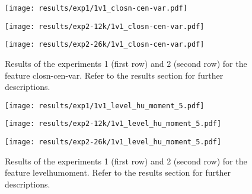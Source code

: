  
\begin{figure}[h!]
    \centering
	\begin{minipage}{0.3\linewidth}
		\texttt{[image: results/exp1/1v1\_closn-cen-var.pdf]}
	\end{minipage}

	\begin{minipage}{0.3\linewidth}
		\texttt{[image: results/exp2-12k/1v1\_closn-cen-var.pdf]}
	\end{minipage}
	\begin{minipage}{0.3\linewidth}
		\texttt{[image: results/exp2-26k/1v1\_closn-cen-var.pdf]}
	\end{minipage}

	\caption[ Results: Feature closn-cen-var]{ Results of the experiments 1 (first row) and 2 (second row) for the feature closn-cen-var. Refer to the results section for further descriptions. }
	\label{fig:appendix_closn-cen-var}
\end{figure}
 
\begin{figure}[h!]
    \centering
	\begin{minipage}{0.3\linewidth}
		\texttt{[image: results/exp1/1v1\_level\_hu\_moment\_5.pdf]}
	\end{minipage}

	\begin{minipage}{0.3\linewidth}
		\texttt{[image: results/exp2-12k/1v1\_level\_hu\_moment\_5.pdf]}
	\end{minipage}
	\begin{minipage}{0.3\linewidth}
		\texttt{[image: results/exp2-26k/1v1\_level\_hu\_moment\_5.pdf]}
	\end{minipage}

	\caption[ Results: Feature level\textunderscore hu\textunderscore moment]{ Results of the experiments 1 (first row) and 2 (second row) for the feature level\textunderscore hu\textunderscore moment. Refer to the results section for further descriptions. }
	\label{fig:appendix_level_hu_moment_5}
\end{figure}
 \newpage 

